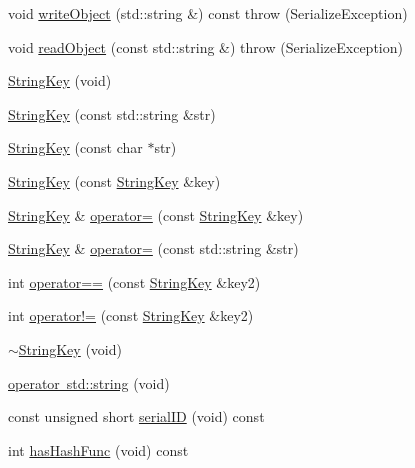 \begin{DoxyCompactItemize}
\item 
void \mbox{\hyperlink{classFILEDB_1_1StringKey_a29db7eea425c851c5e0a4336d7a85fb1}{write\+Object}} (std\+::string \&) const  throw (\+Serialize\+Exception)
\item 
void \mbox{\hyperlink{classFILEDB_1_1StringKey_a25cefb184c88bc5bf871245e82ea21f9}{read\+Object}} (const std\+::string \&)  throw (\+Serialize\+Exception)
\item 
\mbox{\hyperlink{classFILEDB_1_1StringKey_ada360436c743f4464e82b0cb2757d229}{String\+Key}} (void)
\item 
\mbox{\hyperlink{classFILEDB_1_1StringKey_a18edda7351ebadd52d18bcde2cc8a71c}{String\+Key}} (const std\+::string \&str)
\item 
\mbox{\hyperlink{classFILEDB_1_1StringKey_a7710b1f6cafd04e1e178d24019e81ae5}{String\+Key}} (const char $\ast$str)
\item 
\mbox{\hyperlink{classFILEDB_1_1StringKey_a042b0231e08bfbd9f9bc3802d95d0e9c}{String\+Key}} (const \mbox{\hyperlink{classFILEDB_1_1StringKey}{String\+Key}} \&key)
\item 
\mbox{\hyperlink{classFILEDB_1_1StringKey}{String\+Key}} \& \mbox{\hyperlink{classFILEDB_1_1StringKey_ab4a0ca971c84abd8b85f6d423163a00f}{operator=}} (const \mbox{\hyperlink{classFILEDB_1_1StringKey}{String\+Key}} \&key)
\item 
\mbox{\hyperlink{classFILEDB_1_1StringKey}{String\+Key}} \& \mbox{\hyperlink{classFILEDB_1_1StringKey_ad52c218455b3eb934a68f3d13ab6512e}{operator=}} (const std\+::string \&str)
\item 
int \mbox{\hyperlink{classFILEDB_1_1StringKey_a75f2abcdf7d61bb860156f8758a56a1f}{operator==}} (const \mbox{\hyperlink{classFILEDB_1_1StringKey}{String\+Key}} \&key2)
\item 
int \mbox{\hyperlink{classFILEDB_1_1StringKey_ad7c210e36fa7438742afa4ed3c66a3df}{operator!=}} (const \mbox{\hyperlink{classFILEDB_1_1StringKey}{String\+Key}} \&key2)
\item 
\mbox{\hyperlink{classFILEDB_1_1StringKey_a45b2488c42cb895e30b927366ae96785}{$\sim$\+String\+Key}} (void)
\item 
\mbox{\hyperlink{classFILEDB_1_1StringKey_a4ce28a2e70cc35cbf7dd8f7a9424fbb0}{operator std\+::string}} (void)
\item 
const unsigned short \mbox{\hyperlink{classFILEDB_1_1StringKey_ad139b5cab667be479edae524f436805a}{serial\+ID}} (void) const
\item 
int \mbox{\hyperlink{classFILEDB_1_1StringKey_afb2fa99d53c0f4b5aeca0377228ea722}{has\+Hash\+Func}} (void) const

\end{DoxyCompactItemize}
